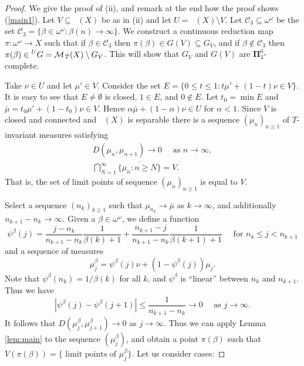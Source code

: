 \documentclass{amsart}
\theoremstyle{definition}
\newcommand{\cC}{\mathcal{C}}
\newcommand{\bP}{\boldsymbol{\Pi}}
\DeclareMathOperator{\MT}{\mathcal{M}_{\mathit T} }
\begin{document}
\begin{proof}
We give the proof of (ii),
and remark at the end how the proof shows (\ref{main1}). Let $V\subseteq \MT(X)$
be as in (ii) and let $U=\MT(X) \setminus V$.
Let $\cC_3\subseteq  \omega ^ \omega$ be the set $\cC_3=\{ \beta\in  \omega ^ \omega \colon \beta(n) \to \infty\}$.
We construct a continuous reduction map
$\pi\colon \omega^\omega\to X$ such that if $\beta \in \mathcal{C}_3$ then $\pi(\beta)\in G(V)\subseteq G_V$,
and if $\beta\notin \mathcal{C}_3$ then $\pi(\beta)\in \prescript{U}{}G=\MT(X)\setminus G_V$.
This will show that $G_V$ and $G(V)$ are $\bP^0_3$-complete.

Take $\nu \in U$ and let $\mu'\in V$. Consider the set
$E=\{0\le t\le 1: t\mu'+(1-t)\nu\in V\}$. It is easy to see that $E\neq \emptyset$ is closed, $1\in E$,
and $0\notin E$. Let $t_0=\min E$ and $\bar\mu=t_0\mu'+(1-t_0)\nu\in V$. %
Hence $\alpha\bar\mu+(1-\alpha)\nu\in U$ for $\alpha<1$.
Since $V$ is closed and connected and $\MT(X)$ is separable there is a
sequence $(\mu_n)_{n\ge 1}$ of $T$-invariant measures satisfying
\begin{gather}
  D(\mu_n,\mu_{n+1})\to  0\quad\text{ as $n\to\infty$}, \label{cond:D-to-0}\\
  \bigcap_{N=1}^\infty\overline{\{\mu_n:n\ge N\}}=V .\label{cond:density-in-V}
\end{gather}
That is, the set of limit points of sequence $(\mu_n)_{n \ge 1}$ is equal to $V$.

Select a sequence $(n_k)_{k\ge 1}$ such that $\mu_{n_k}\to\bar\mu$ as $k\to\infty$, and additionally $n_{k+1} - n_k \to \infty$. Given a $\beta \in \omega ^ \omega$, we define a function
\begin{equation} \label{eqn:psibeta}
\psi^\beta (j) = \frac{j - n_k}{n_{k+1} - n_k} \frac{1}{\beta(k) + 1} + \frac{n_{k+1} - j}{n_{k+1} - n_k} \frac{1}{\beta(k+1) + 1}
\quad \textrm{ for } n_k \le j < n_{k+1}
\end{equation}
and a sequence of measures
\[
\mu^\beta_j = \psi^\beta (j) \nu + (1 - \psi^\beta (j) ) \mu_j.
\]
Note that $\psi^\beta(n_k) = 1/\beta(k)$ for all $k$, and $\psi^\beta$ is ``linear'' between $n_k$ and $n_{k+1}$. Thus we have
\begin{equation*}
| \psi^\beta(j) - \psi^\beta(j+1) | \le \frac{1}{n_{k+1} - n_k} \to 0 \quad \textrm{ as } j \to \infty.
\end{equation*}
It follows that $D(\mu^\beta_j, \mu^\beta_{j+1}) \to 0$ as $j \to \infty$. Thus we can apply Lemma \ref{lem:main} to the sequence $(\mu^\beta_j)$, and obtain a point $\pi(\beta)$ such that $V(\pi(\beta)) = \{ \textrm{ limit points of } \mu^\beta_j \}$. Let us consider cases:


\end{proof}
\end{document}
